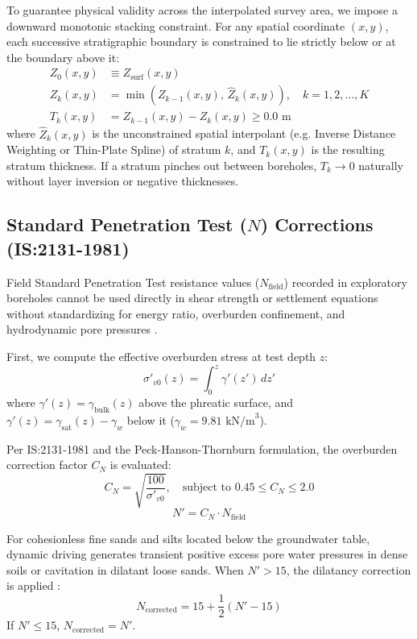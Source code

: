 \documentclass[11pt,a4paper]{article}
\begin{document}
To guarantee physical validity across the interpolated survey area, we impose a downward monotonic stacking constraint. For any spatial coordinate $(x, y)$, each successive stratigraphic boundary is constrained to lie strictly below or at the boundary above it:
\begin{align}
Z_0(x, y) &\equiv Z_{\text{surf}}(x, y) \\
Z_k(x, y) &= \min\left(Z_{k-1}(x, y), \, \hat{Z}_k(x, y)\right), \quad k = 1, 2, \dots, K \\
T_k(x, y) &= Z_{k-1}(x, y) - Z_k(x, y) \ge 0.0\text{ m}
\end{align}
where $\hat{Z}_k(x, y)$ is the unconstrained spatial interpolant (e.g. Inverse Distance Weighting or Thin-Plate Spline) of stratum $k$, and $T_k(x, y)$ is the resulting stratum thickness. If a stratum pinches out between boreholes, $T_k \to 0$ naturally without layer inversion or negative thicknesses.

\subsection{Standard Penetration Test ($N$) Corrections (IS:2131-1981)}

Field Standard Penetration Test resistance values ($N_{\text{field}}$) recorded in exploratory boreholes cannot be used directly in shear strength or settlement equations without standardizing for energy ratio, overburden confinement, and hydrodynamic pore pressures \cite{is2131,bowles1996foundation}. 

First, we compute the effective overburden stress at test depth $z$:
\begin{equation}
\sigma'_{v0}(z) = \int_0^z \gamma'(z') \, dz'
\end{equation}
where $\gamma'(z) = \gamma_{\text{bulk}}(z)$ above the phreatic surface, and $\gamma'(z) = \gamma_{\text{sat}}(z) - \gamma_w$ below it ($\gamma_w = 9.81\text{ kN/m}^3$).

Per IS:2131-1981 and the Peck-Hanson-Thornburn formulation, the overburden correction factor $C_N$ is evaluated:
\begin{equation}
C_N = \sqrt{\frac{100}{\sigma'_{v0}}}, \quad \text{subject to } 0.45 \le C_N \le 2.0
\end{equation}
\begin{equation}
N' = C_N \cdot N_{\text{field}}
\end{equation}

For cohesionless fine sands and silts located below the groundwater table, dynamic driving generates transient positive excess pore water pressures in dense soils or cavitation in dilatant loose sands. When $N' > 15$, the dilatancy correction is applied \cite{is2131}:
\begin{equation}
N_{\text{corrected}} = 15 + \frac{1}{2}\left(N' - 15\right)
\end{equation}
If $N' \le 15$, $N_{\text{corrected}} = N'$.
\end{document}
